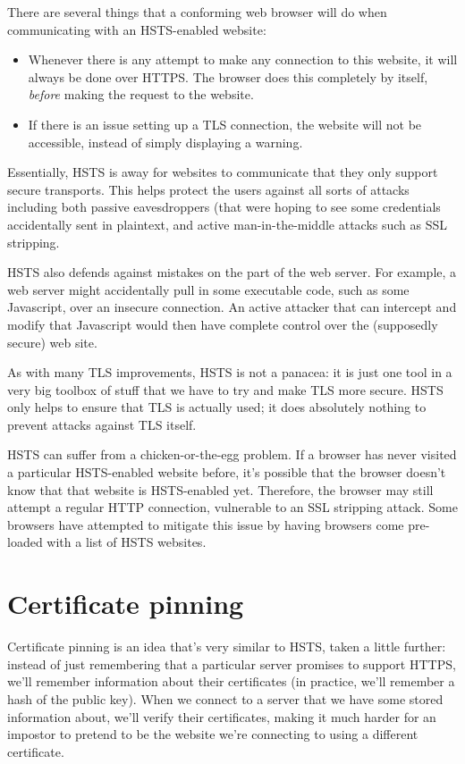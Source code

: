 \documentclass[11pt,ebook,table,dvipsnames]{memoir}
\begin{document}
There are several things that a conforming web browser will do when
communicating with an HSTS-enabled website:

\begin{itemize}
\item Whenever there is any attempt to make any connection to this
website, it will always be done over HTTPS. The browser does this
completely by itself, \emph{before} making the request to the website.
\item If there is an issue setting up a TLS connection, the website will
not be accessible, instead of simply displaying a warning.
\end{itemize}

Essentially, HSTS is away for websites to communicate that they only
support secure transports. This helps protect the users against all
sorts of attacks including both passive eavesdroppers (that were
hoping to see some credentials accidentally sent in plaintext, and
active man-in-the-middle attacks such as SSL stripping.

HSTS also defends against mistakes on the part of the web server. For
example, a web server might accidentally pull in some executable code,
such as some Javascript, over an insecure connection. An active
attacker that can intercept and modify that Javascript would then have
complete control over the (supposedly secure) web site.

As with many TLS improvements, HSTS is not a panacea: it is just one
tool in a very big toolbox of stuff that we have to try and make TLS
more secure. HSTS only helps to ensure that TLS is actually used; it
does absolutely nothing to prevent attacks against TLS itself.

HSTS can suffer from a chicken-or-the-egg problem. If a browser has
never visited a particular HSTS-enabled website before, it's possible
that the browser doesn't know that that website is HSTS-enabled yet.
Therefore, the browser may still attempt a regular HTTP connection,
vulnerable to an SSL stripping attack. Some browsers have attempted to
mitigate this issue by having browsers come pre-loaded with a list of
HSTS websites.
\section{Certificate pinning}
\label{sec-3-1-10}

Certificate pinning is an idea that's very similar to HSTS, taken a
little further: instead of just remembering that a particular server
promises to support HTTPS, we'll remember information about their
certificates (in practice, we'll remember a hash of the public key).
When we connect to a server that we have some stored information
about, we'll verify their certificates, making it much harder for an
impostor to pretend to be the website we're connecting to using a
different certificate.
\end{document}

